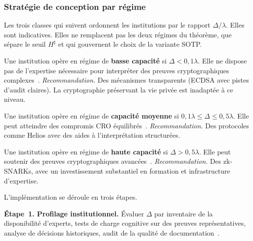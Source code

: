 \begin{sloppypar}
\subsubsection{Strat\'egie de conception par r\'egime}
\label{subsubsec:strategie_par_regime}

Les trois classes qui suivent ordonnent les institutions par le rapport $\Delta/\lambda$. Elles sont
indicatives. Elles ne remplacent pas les deux r\'egimes du th\'eor\`eme, que s\'epare le seuil $H^\sharp$
et qui gouvernent le choix de la variante SOTP.

\begin{definition}\label{def:regime_low}
Une institution op\`ere en r\'egime de \textbf{basse capacit\'e} si
$\Delta < 0{,}1\lambda$. Elle ne dispose pas de l'expertise n\'ecessaire
pour interpr\'eter des preuves cryptographiques
complexes~\cite{Herley09}. \textit{Recommandation.} Des m\'ecanismes
transparents (ECDSA avec pistes d'audit claires). La cryptographie
pr\'eservant la vie priv\'ee est inadapt\'ee \`a ce niveau.
\end{definition}

\begin{definition}\label{def:regime_mid}
Une institution op\`ere en r\'egime de \textbf{capacit\'e moyenne} si
$0{,}1\lambda \le \Delta \le 0{,}5\lambda$. Elle peut atteindre des
compromis CRO \'equilibr\'es~\cite{Grossklags10}.
\textit{Recommandation.} Des protocoles comme Helios avec des aides
\`a l'interpr\'etation structur\'ees.
\end{definition}

\begin{definition}\label{def:regime_high}
Une institution op\`ere en r\'egime de \textbf{haute capacit\'e} si
$\Delta > 0{,}5\lambda$. Elle peut soutenir des preuves cryptographiques
avanc\'ees~\cite{Grossklags10,Simon82}. \textit{Recommandation.}
Des zk-SNARKs, avec un investissement substantiel en formation et infrastructure
d'expertise.
\end{definition}

L'implémentation se déroule en trois étapes.

\textbf{\'Etape~1. Profilage institutionnel.} \'Evaluer $\Delta$ par inventaire de la
disponibilit\'e d'experts, tests de charge cognitive sur des preuves
repr\'esentatives, analyse de d\'ecisions historiques, audit de la
qualit\'e de documentation~\cite{Miller56,Ericsson95,Simon82}.


\end{sloppypar}
